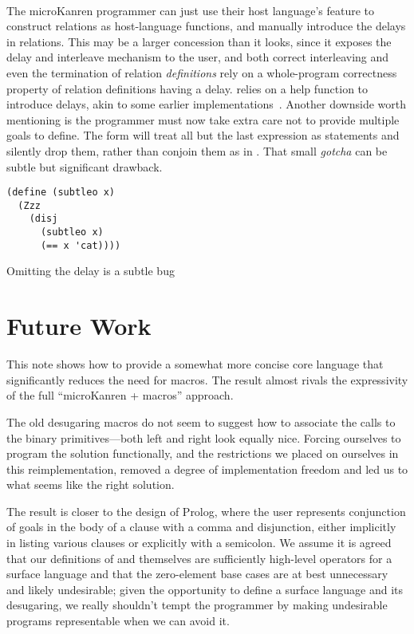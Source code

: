 \documentclass[sigplan,balance,pbalance,natbib=false]{acmart}
\begin{document}
\paragraph{}

The microKanren programmer can just use their host
language's  feature to construct relations as
host-language functions, and manually introduce the delays in
relations. This may be a larger concession than it looks, since it
exposes the delay and interleave mechanism to the user, and both
correct interleaving and even the termination of relation
\emph{definitions} rely on a whole-program correctness property of
relation definitions having a delay.  relies on a
help function  to introduce delays, akin to some
earlier implementations~\cite{hemann2013muKanren}. Another downside
worth mentioning is the programmer must now take extra care not to
provide multiple goals to define. The  form will
treat all but the last expression as statements and silently drop
them, rather than conjoin them as in . That small
\emph{gotcha} can be subtle but significant drawback.

\begin{listing}
  \begin{verbatim}
(define (subtleo x)
  (Zzz
    (disj
      (subtleo x)
      (== x 'cat))))
  \end{verbatim}
  \caption{Omitting the delay is a subtle bug}\label{mnt:subtleo}
\end{listing}

\section{Future Work}\label{sec:conclusion}

This note shows how to provide a somewhat more concise core language
that significantly reduces the need for macros. The result almost
rivals the expressivity of the full \enquote{microKanren + macros}
approach.

The old desugaring macros do not seem to suggest how to associate the
calls to the binary primitives---both left and right look equally
nice. Forcing ourselves to program the solution functionally, and the
restrictions we placed on ourselves in this reimplementation, removed
a degree of implementation freedom and led us to what seems like the
right solution.

The result is closer to the design of Prolog, where the user
represents conjunction of goals in the body of a clause with a comma
and disjunction, either implicitly in listing various clauses or
explicitly with a semicolon. We assume it is agreed that our
definitions of  and  themselves are
sufficiently high-level operators for a surface language and that the
zero-element base cases are at best unnecessary and likely
undesirable; given the opportunity to define a surface language and
its desugaring, we really shouldn't tempt the programmer by making
undesirable programs representable when we can avoid it.
\end{document}
